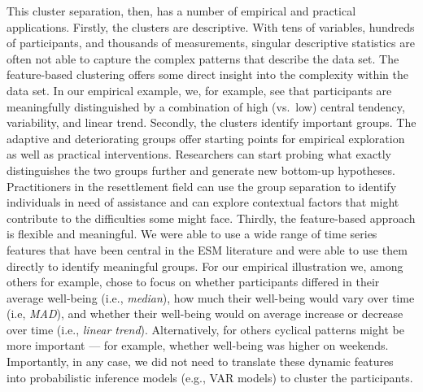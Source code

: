 This cluster separation, then, has a number of empirical and practical
applications. Firstly, the clusters are descriptive. With tens of
variables, hundreds of participants, and thousands of measurements,
singular descriptive statistics are often not able to capture the
complex patterns that describe the data set. The feature-based
clustering offers some direct insight into the complexity within the
data set. In our empirical example, we, for example, see that
participants are meaningfully distinguished by a combination of high
(vs.~low) central tendency, variability, and linear trend. Secondly, the
clusters identify important groups. The adaptive and deteriorating
groups offer starting points for empirical exploration as well as
practical interventions. Researchers can start probing what exactly
distinguishes the two groups further and generate new bottom-up
hypotheses. Practitioners in the resettlement field can use the group
separation to identify individuals in need of assistance and can explore
contextual factors that might contribute to the difficulties some might
face. Thirdly, the feature-based approach is flexible and meaningful. We
were able to use a wide range of time series features that have been
central in the ESM literature and were able to use them directly to
identify meaningful groups. For our empirical illustration we, among
others for example, chose to focus on whether participants differed in
their average well-being (i.e., \textit{median}), how much their
well-being would vary over time (i.e, \textit{MAD}), and whether their
well-being would on average increase or decrease over time (i.e.,
\textit{linear trend}). Alternatively, for others cyclical patterns
might be more important --- for example, whether well-being was higher
on weekends. Importantly, in any case, we did not need to translate
these dynamic features into probabilistic inference models (e.g., VAR
models) to cluster the participants.

